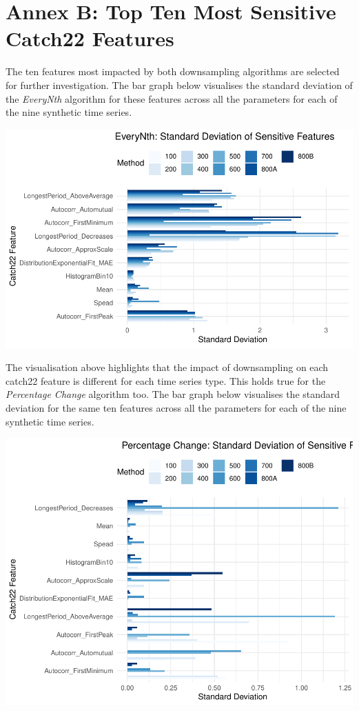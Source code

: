 \documentclass{article}
\begin{document}
\hypertarget{annex-b-top-ten-most-sensitive-catch22-features}{%
\section{Annex B: Top Ten Most Sensitive Catch22
Features}\label{annex-b-top-ten-most-sensitive-catch22-features}}

The ten features most impacted by both downsampling algorithms are
selected for further investigation. The bar graph below visualises the
standard deviation of the \emph{EveryNth} algorithm for these features
across all the parameters for each of the nine synthetic time series.

\includegraphics{210431461_CSC8639_Dissertation_files/figure-latex/NthSensitivity-1.pdf}

The visualisation above highlights that the impact of downsampling on
each catch22 feature is different for each time series type. This holds
true for the \emph{Percentage Change} algorithm too. The bar graph below
visualises the standard deviation for the same ten features across all
the parameters for each of the nine synthetic time series.

\includegraphics{210431461_CSC8639_Dissertation_files/figure-latex/PCSensitivity-1.pdf}
\end{document}
